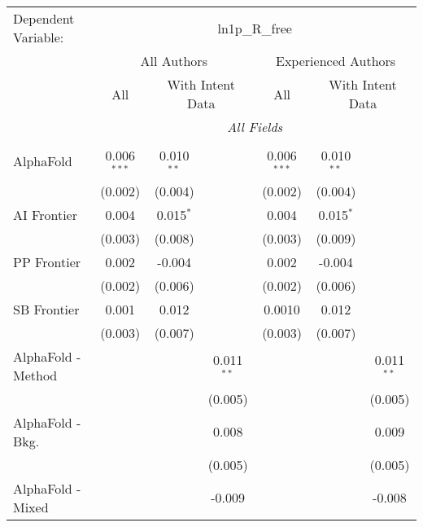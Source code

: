 \begingroup
\centering
\begin{tabular}{lcccccc}
   \tabularnewline \midrule \midrule
   Dependent Variable: & \multicolumn{6}{c}{ln1p\_R\_free}\\
 & \multicolumn{3}{c}{All Authors} & \multicolumn{3}{c}{Experienced Authors} \\
\cmidrule(lr){2-4} \cmidrule(lr){5-7}
 & \multicolumn{1}{c}{All} & \multicolumn{2}{c}{With Intent Data} & \multicolumn{1}{c}{All} & \multicolumn{2}{c}{With Intent Data} \\
\cmidrule(lr){2-2} \cmidrule(lr){3-4} \cmidrule(lr){5-5} \cmidrule(lr){6-7}
 & \multicolumn{6}{c}{\textit{All Fields}} \\ \\
   AlphaFold            & 0.006$^{***}$ & 0.010$^{**}$ &              & 0.006$^{***}$ & 0.010$^{**}$ &   \\   
                        & (0.002)       & (0.004)      &              & (0.002)       & (0.004)      &   \\   
   AI Frontier          & 0.004         & 0.015$^{*}$  &              & 0.004         & 0.015$^{*}$  &   \\   
                        & (0.003)       & (0.008)      &              & (0.003)       & (0.009)      &   \\   
   PP Frontier          & 0.002         & -0.004       &              & 0.002         & -0.004       &   \\   
                        & (0.002)       & (0.006)      &              & (0.002)       & (0.006)      &   \\   
   SB Frontier          & 0.001         & 0.012        &              & 0.0010        & 0.012        &   \\   
                        & (0.003)       & (0.007)      &              & (0.003)       & (0.007)      &   \\   
   AlphaFold - Method   &               &              & 0.011$^{**}$ &               &              & 0.011$^{**}$\\   
                        &               &              & (0.005)      &               &              & (0.005)\\   
   AlphaFold - Bkg.     &               &              & 0.008        &               &              & 0.009\\   
                        &               &              & (0.005)      &               &              & (0.005)\\   
   AlphaFold - Mixed    &               &              & -0.009       &               &              & -0.008\\   

\end{tabular}
